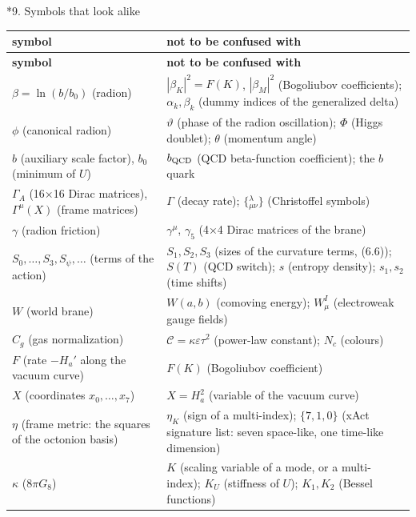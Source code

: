\documentclass[10pt,a4paper]{article}
\makeatletter
\renewcommand\section{\@startsection{section}{1}{\z@}{-3.5ex \@plus -1ex \@minus -.2ex}{2.3ex \@plus.2ex}{\normalfont\Large\bfseries\raggedright}}
\makeatother
\begin{document}
\section*{9. Symbols that look alike}
{\small
\begin{longtable}{>{\raggedright\arraybackslash}p{}>{\raggedright\arraybackslash}p{}}
\toprule
\textbf{symbol} & \textbf{not to be confused with} \\
\midrule\endfirsthead
\toprule
\textbf{symbol} & \textbf{not to be confused with} \\
\midrule\endhead
\endfoot
\bottomrule\endlastfoot
$\beta=\ln(b/b_0)$ (radion) & $|\beta_K|^2=F(K)$, $|\beta_M|^2$ (Bogoliubov coefficients); $\alpha_k,\beta_k$ (dummy indices of the generalized delta) \\
$\phi$ (canonical radion) & $\vartheta$ (phase of the radion oscillation); $\Phi$ (Higgs doublet); $\theta$ (momentum angle) \\
$b$ (auxiliary scale factor), $b_0$ (minimum of $U$) & $b_{\rm QCD}$ (QCD beta-function coefficient); the $b$ quark \\
$\Gamma_A$ (16×16 Dirac matrices), $\Gamma^\mu(X)$ (frame matrices) & $\Gamma$ (decay rate); $\{{}^{\lambda}_{\mu\nu}\}$ (Christoffel symbols) \\
$\gamma$ (radion friction) & $\gamma^\mu$, $\gamma_5$ (4×4 Dirac matrices of the brane) \\
$S_0,\dots,S_3,S_\psi,\dots$ (terms of the action) & $S_1,S_2,S_3$ (sizes of the curvature terms, (6.6)); $S(T)$ (QCD switch); $s$ (entropy density); $s_1,s_2$ (time shifts) \\
$W$ (world brane) & $W(a,b)$ (comoving energy); $W^I_\mu$ (electroweak gauge fields) \\
$C_g$ (gas normalization) & $\mathcal C=\kappa\varepsilon\tau^2$ (power-law constant); $N_c$ (colours) \\
$F$ (rate $-H_a'$ along the vacuum curve) & $F(K)$ (Bogoliubov coefficient) \\
$X$ (coordinates $x_0,\dots,x_7$) & $X=H_a^2$ (variable of the vacuum curve) \\
$\eta$ (frame metric: the squares of the octonion basis) & $\eta_K$ (sign of a multi-index); $\{7,1,0\}$ (xAct signature list: seven space-like, one time-like dimension) \\
$\kappa$ ($8\pi G_8$) & $K$ (scaling variable of a mode, or a multi-index); $K_U$ (stiffness of $U$); $K_1,K_2$ (Bessel functions) \\

\end{longtable}}
\end{document}

